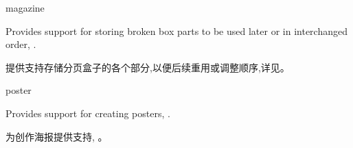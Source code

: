 \begin{docTcbKey}[library]{magazine}{}{}

Provides support for storing broken box parts to be used later or
in interchanged order, .

提供支持存储分页盒子的各个部分,以便后续重用或调整顺序,详见。

\end{docTcbKey}
















\begin{docTcbKey}[library]{poster}{}{}

Provides support for creating posters, .

为创作海报提供支持, 。

\end{docTcbKey}



